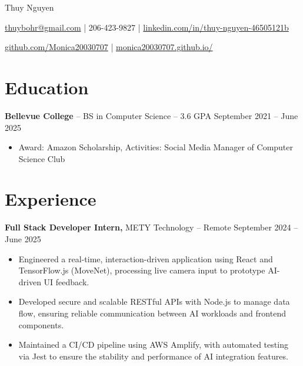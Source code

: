 \documentclass[11pt]{article}       %
\begin{document}
\centerline{\Huge Thuy Nguyen}

\vspace{5pt}

\centerline{\href{mailto:thuybohr@gmail.com}{thuybohr@gmail.com} | 206-423-9827 |
\href{https://www.linkedin.com/in/thuy-nguyen-46505121b/}{linkedin.com/in/thuy-nguyen-46505121b}}

\centerline{\href{https://github.com/Monica20030707}{github.com/Monica20030707} | 
\href{https://monica20030707.github.io/}{monica20030707.github.io/}} 

\vspace{-9pt}

\section*{Education}
\textbf{Bellevue College} -- BS in Computer Science -- 3.6 GPA \hfill September 2021 -- June 2025\\
\vspace{-9pt}
\begin{itemize}
  \item Award: Amazon Scholarship, Activities: Social Media Manager of Computer Science Club
\end{itemize}

\vspace{-18.5pt}

\section*{Experience}

\textbf{Full Stack Developer Intern,} {METY Technology} -- Remote \hfill September 2024 -- June 2025 
\vspace{-9pt}
\begin{itemize}
  \item Engineered a real-time, interaction-driven application using React and TensorFlow.js (MoveNet), processing live camera input to prototype AI-driven UI feedback.
  \item Developed secure and scalable RESTful APIs with Node.js to manage data flow, ensuring reliable communication between AI workloads and frontend components.
  \item Maintained a CI/CD pipeline using AWS Amplify, with automated testing via Jest to ensure the stability and performance of AI integration features.
\end{itemize}
\end{document}
